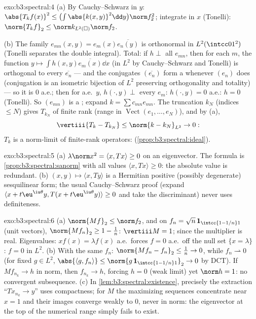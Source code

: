 \begin{solution}{exo:b3:spectral:4}
(a) By Cauchy--Schwarz in $y$: $\abs{T_kf(x)}^2 \leq
\bigl(\int\abs{k(x,y)}^2\dd y\bigr)\norm f_2^2$; integrate in
$x$ (Tonelli): $\norm{T_kf}_2 \leq \norm k_{L^2(\square)}
\norm f_2$.

(b) The family $e_{mn}(x,y) = e_m(x)\overline{e_n(y)}$ is
orthonormal in $L^2(\intcc01^2)$ (Tonelli separates the double
integral). Total: if $h \perp$ all $e_{mn}$, then for each
$m$, the function $y \mapsto \int h(x,y)\overline{e_m(x)}\dd
x$ (in $L^2$ by Cauchy--Schwarz and Tonelli) is orthogonal to
every $\overline{e_n}$ --- and the conjugates
$(\overline{e_n})$ form a  whenever $(e_n)$ does
(conjugation is an isometric bijection of $L^2$ preserving
orthogonality and totality) --- so it is $0$ a.e.; then for a.e.\ $y$, $h(\cdot, y) \perp$ every
$e_m$: $h(\cdot, y) = 0$ a.e.: $h = 0$ (Tonelli). So
$(e_{mn})$ is a ; expand $k = \sum c_{mn}e_{mn}$.
The truncation $k_N$ (indices $\leq N$) gives $T_{k_N}$ of
finite rank (range in $\operatorname{Vect}(e_1, \dots,
e_N)$), and by (a),
\[
\vertiii{T_k - T_{k_N}} \leq \norm{k - k_N}_{L^2} \to 0 :
\]
$T_k$ is a norm-limit of finite-rank operators: 
(\cref{prop:b3:spectral:ideal}).
\end{solution}

\begin{solution}{exo:b3:spectral:5}
(a) $\lambda\norm x^2 = \langle x, Tx\rangle \geq 0$ on an
eigenvector. The formula is
\cref{prop:b3:spectral:sanorm} with all values $\langle x,
Tx\rangle \geq 0$: the absolute value is redundant.
(b) $(x, y) \mapsto \langle x, Ty\rangle$ is a Hermitian
positive (possibly degenerate) sesquilinear form; the usual
Cauchy--Schwarz proof (expand $\langle x + t\eu^{\iu\theta}y,
T(x + t\eu^{\iu\theta}y)\rangle \geq 0$ and take the
discriminant) never uses definiteness.
\end{solution}

\begin{solution}{exo:b3:spectral:6}
(a) $\norm{Mf}_2 \leq \norm f_2$, and on $f_n = \sqrt n\,
\mathbf 1_{\intcc{1 - 1/n}1}$ (unit vectors), $\norm{Mf_n}_2
\geq 1 - \frac1n$: $\vertiii M = 1$;  since the
multiplier is real. Eigenvalues: $xf(x) = \lambda f(x)$ a.e.\
forces $f = 0$ a.e.\ off the null set $\{x = \lambda\}$: $f =
0$ in $L^2$.
(b) With the same $f_n$: $\norm{Mf_n - f_n}_2 \leq \frac1n \to
0$, while $f_n \rightharpoonup 0$ (for fixed $g \in L^2$,
$\abs{\langle g, f_n\rangle} \leq \norm{g\,\mathbf
1_{\intcc{1-1/n}1}}_2 \to 0$ by DCT). If $Mf_{n_k} \to h$ in
norm, then $f_{n_k} \to h$, forcing $h = 0$ (weak limit) yet
$\norm h = 1$: no convergent subsequence.
(c) In \cref{lem:b3:spectral:existence}, precisely the
extraction ``$Tx_{n_k} \to y$'' uses compactness; for $M$ the
maximizing sequences concentrate near $x = 1$ and their
images converge weakly to $0$, never in norm: the eigenvector
at the top of the numerical range simply fails to exist.
\end{solution}

